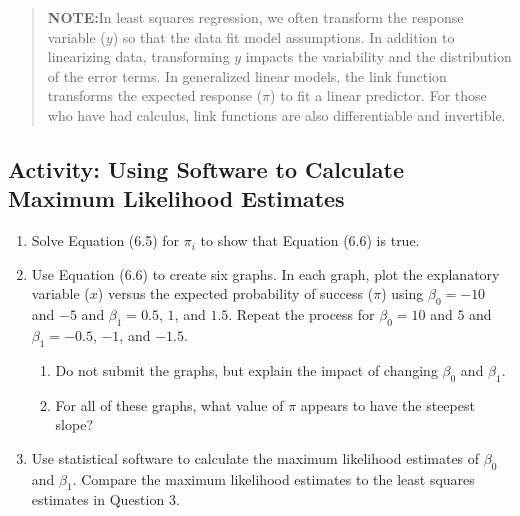 \documentclass[
]{book}
\providecommand{\tightlist}{%
  \setlength{\itemsep}{0pt}\setlength{\parskip}{0pt}}
\begin{document}
\begin{quote}
\textbf{NOTE:}In least squares regression, we often transform the response variable (\(y\)) so that the data fit model assumptions. In addition to linearizing data, transforming \(y\) impacts the variability and the distribution of the error terms. In generalized linear models, the link function transforms the expected response (\(\pi\)) to fit a linear predictor. For those who have had calculus, link functions are also differentiable and invertible.
\end{quote}

\hypertarget{activity-using-software-to-calculate-maximum-likelihood-estimates}{%
\subsection*{Activity: Using Software to Calculate Maximum Likelihood Estimates}\label{activity-using-software-to-calculate-maximum-likelihood-estimates}}

\begin{enumerate}
\def\labelenumi{\arabic{enumi}.}
\setcounter{enumi}{3}
\item
  Solve Equation (6.5) for \(\pi_i\) to show that Equation (6.6) is true.
\item
  Use Equation (6.6) to create six graphs. In each graph, plot the explanatory variable (\(x\)) versus the expected probability of success (\(\pi\)) using \(\beta_0 = -10\) and \(-5\) and \(\beta_1 = 0.5\), \(1\), and \(1.5\). Repeat the process for \(\beta_0 = 10\) and \(5\) and \(\beta_1 = -0.5\), \(-1\), and \(-1.5\).

  \begin{enumerate}
  \def\labelenumii{\alph{enumii}.}
  \tightlist
  \item
    Do not submit the graphs, but explain the impact of changing \(\beta_0\) and \(\beta_1\).\\
  \item
    For all of these graphs, what value of \(\pi\) appears to have the steepest slope?
  \end{enumerate}
\item
  Use statistical software to calculate the maximum likelihood estimates of \(\beta_0\) and \(\beta_1\). Compare the maximum likelihood estimates to the least squares estimates in Question 3.
\end{enumerate}
\end{document}
